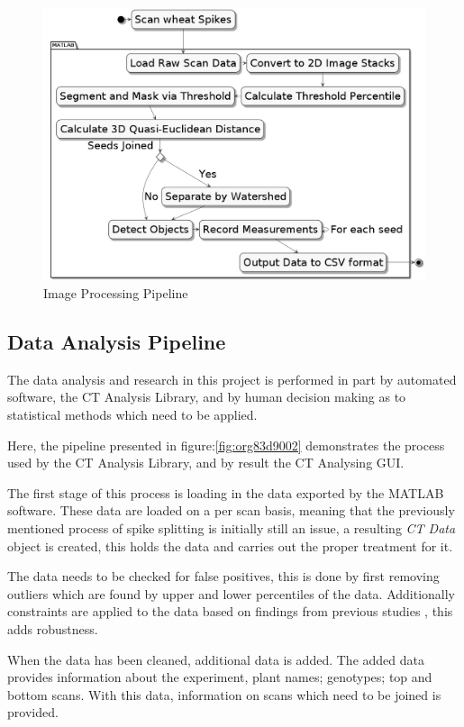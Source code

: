 \documentclass[11pt]{report}
\begin{document}
\begin{figure}[htbp]
\centering
\includegraphics[width=15cm]{./images/matlab.png}
\caption{\label{fig:org32e02bf}
Image Processing Pipeline}
\end{figure}

\subsection{Data Analysis Pipeline}
\label{sec:org63f848a}
The data analysis and research in this project is performed in part by automated software, the CT Analysis Library, and by human decision making as to statistical methods which need to be applied.

Here, the pipeline presented in figure:\ref{fig:org83d9002} demonstrates the process used by the CT Analysis Library, and by result the CT Analysing GUI.

The first stage of this process is loading in the data exported by the MATLAB software. These data are loaded on a per scan basis, meaning that the previously mentioned process of spike splitting is initially still an issue, a resulting \emph{CT Data} object is created, this holds the data and carries out the proper treatment for it.

The data needs to be checked for false positives, this is done by first removing outliers which are found by upper and lower percentiles of the data. Additionally constraints are applied to the data based on findings from previous studies \cite{Hughes2017}, this adds robustness.

When the data has been cleaned, additional data is added. The added data provides information about the experiment, plant names; genotypes; top and bottom scans. With this data, information on scans which need to be joined is provided.
\end{document}

